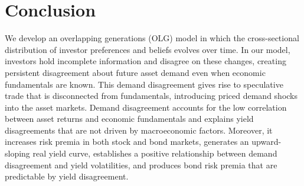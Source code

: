 \documentclass[preprint,11pt,authoryear]{elsarticle}
\renewcommand{\baselinestretch}{2}
\theoremstyle{plain}
\begin{document}
\section{Conclusion}\label{sec:conclusion}

We develop an overlapping generations (OLG) model in which the cross-sectional distribution of investor preferences and beliefs evolves over time. In our model, investors hold incomplete information and disagree on these changes, creating persistent disagreement about future asset demand even when economic fundamentals are known. This demand disagreement gives rise to speculative trade that is disconnected from fundamentals, introducing priced demand shocks into the asset markets.  Demand disagreement accounts for the low correlation between asset returns and economic fundamentals and explains yield disagreements that are not driven by macroeconomic factors. Moreover, it increases risk premia in both stock and bond markets, generates an upward-sloping real yield curve, establishes a positive relationship between demand disagreement and yield volatilities, and produces bond risk premia that are predictable by yield disagreement. 


 \begingroup
	
	\label{references}
\endgroup   

\renewcommand{\baselinestretch}{1}  %
    

\appendix

 
\end{document}

